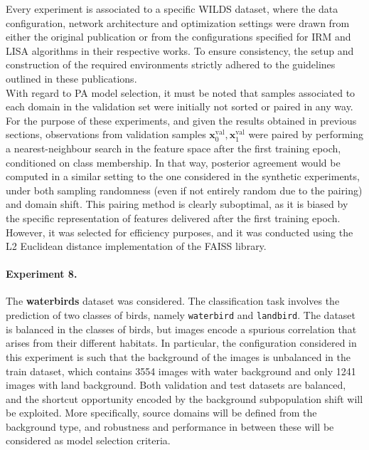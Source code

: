 Every experiment is associated to a specific WILDS dataset, where the data configuration, network architecture
and  optimization settings were drawn from either the original publication or from the configurations specified for 
IRM \cite{arjovskyInvariantRiskMinimization2020} and 
LISA \cite{yaoImprovingOutofDistributionRobustness2022} algorithms in their respective works. 
To ensure consistency, the setup and construction of the required environments strictly adhered to the 
guidelines outlined in these publications. \\

With regard to PA model selection, it must be noted that samples associated to each domain in
the validation set were initially not sorted or paired in any way. For the purpose of these experiments, and given
the results obtained in previous sections, observations from validation samples $\bm{x}_0^{\text{val}}, \bm{x}_1^{\text{val}}$
were paired by performing a nearest-neighbour search in the feature space after the first training epoch, conditioned on class membership. In that way,
posterior agreement would be computed in a similar setting to the one considered in the synthetic experiments, under both 
sampling randomness (even if not entirely random due to the pairing) and domain shift. This pairing method is clearly
suboptimal, as it is biased by the specific representation of features delivered after the first training epoch. However, it was selected for
efficiency purposes, and it was conducted using the L2 Euclidean distance implementation of the FAISS \cite{faiss} library.

\paragraph{Experiment 8.} The \textbf{waterbirds} dataset was considered. The classification task involves the prediction of
two classes of birds, namely \texttt{waterbird} and \texttt{landbird}. The dataset is balanced in the classes of birds, but images encode a
spurious correlation that arises from their different habitats. In particular, the configuration considered in this experiment is such that
the background of the images is unbalanced in the train dataset, which contains 3554 images with water background and only 1241 images
with land background. Both validation and test datasets are balanced, and the shortcut opportunity encoded by the background subpopulation
shift will be exploited. More specifically, source domains will be defined from the background type, and robustness and performance in between
these will be considered as model selection criteria.

